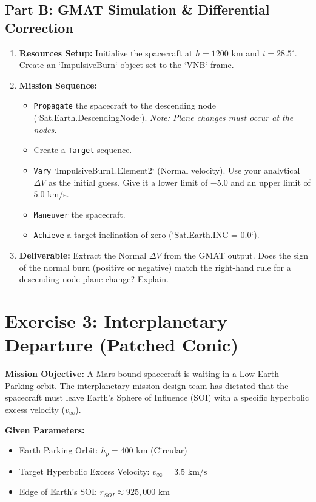 \documentclass[11pt, letterpaper]{article}
\begin{document}
\subsection*{Part B: GMAT Simulation \& Differential Correction}
\begin{enumerate}
    \item \textbf{Resources Setup:} Initialize the spacecraft at $h = 1200 \text{ km}$ and $i = 28.5^\circ$. Create an `ImpulsiveBurn` object set to the `VNB` frame. 
    \item \textbf{Mission Sequence:}
        \begin{itemize}
            \item \texttt{Propagate} the spacecraft to the descending node (`Sat.Earth.DescendingNode`). \textit{Note: Plane changes must occur at the nodes.}
            \item Create a \texttt{Target} sequence.
            \item \texttt{Vary} `ImpulsiveBurn1.Element2` (Normal velocity). Use your analytical $\Delta V$ as the initial guess. Give it a lower limit of $-5.0$ and an upper limit of $5.0$ km/s.
            \item \texttt{Maneuver} the spacecraft.
            \item \texttt{Achieve} a target inclination of zero (`Sat.Earth.INC = 0.0`).
        \end{itemize}
    \item \textbf{Deliverable:} Extract the Normal $\Delta V$ from the GMAT output. Does the sign of the normal burn (positive or negative) match the right-hand rule for a descending node plane change? Explain.
\end{enumerate}

\section*{Exercise 3: Interplanetary Departure (Patched Conic)}
\textbf{Mission Objective:} A Mars-bound spacecraft is waiting in a Low Earth Parking orbit. The interplanetary mission design team has dictated that the spacecraft must leave Earth's Sphere of Influence (SOI) with a specific hyperbolic excess velocity ($v_\infty$). 

\textbf{Given Parameters:}
\begin{itemize}
    \item Earth Parking Orbit: $h_p = 400 \text{ km}$ (Circular)
    \item Target Hyperbolic Excess Velocity: $v_\infty = 3.5 \text{ km/s}$
    \item Edge of Earth's SOI: $r_{SOI} \approx 925,000 \text{ km}$
\end{itemize}
\end{document}
